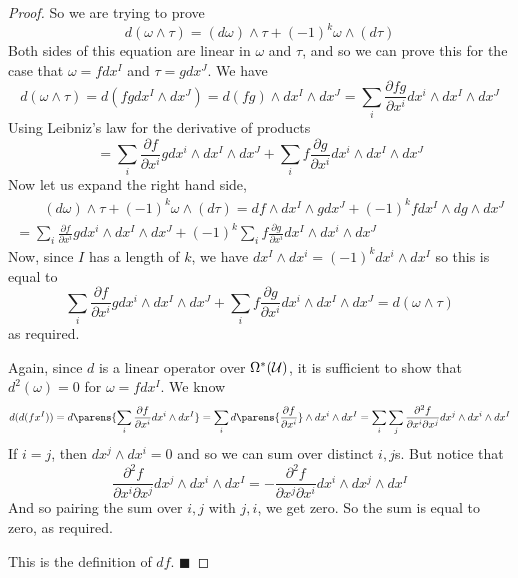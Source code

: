 \documentclass[10pt]{article}
\def\mU{{\cal U}}
\def\qed{%
    \ifmmode%
        \eqno\blacksquare%
    \else%
        \hskip1cm\allowbreak\hbox{}\nobreak\hfill$\blacksquare$%
    \fi%
}
\begin{document}
\begin{proof}

    \benum
        \item So we are trying to prove
            \[ d(\omega\wedge\tau) = (d\omega)\wedge\tau + (-1)^k\omega\wedge(d\tau) \]
            Both sides of this equation are linear in $\omega$ and $\tau$, and so we can prove this for the case that $\omega=fdx^I$ and $\tau=gdx^J$.
            We have
            \[ d(\omega\wedge\tau) = d(fgdx^I\wedge dx^J) = d(fg)\wedge dx^I\wedge dx^J = \sum_i\frac{\partial fg}{\partial x^i}dx^i\wedge dx^I\wedge dx^J \]
            Using Leibniz's law for the derivative of products
            \[ = \sum_i\frac{\partial f}{\partial x^i}gdx^i\wedge dx^I\wedge dx^J + \sum_if\frac{\partial g}{\partial x^i}dx^i\wedge dx^I\wedge dx^J \]
            Now let us expand the right hand side,
            \begin{multline*}
                \qquad(d\omega)\wedge\tau + (-1)^k\omega\wedge(d\tau) = df\wedge dx^I\wedge gdx^J + (-1)^k fdx^I\wedge dg\wedge dx^J \\
                = \sum_i\frac{\partial f}{\partial x^i}gdx^i\wedge dx^I\wedge dx^J + (-1)^k\sum_i f\frac{\partial g}{\partial x^i}dx^I\wedge dx^i\wedge dx^J
            \end{multline*}
            Now, since $I$ has a length of $k$, we have $dx^I\wedge dx^i=(-1)^kdx^i\wedge dx^I$ so this is equal to
            \[ \sum_i\frac{\partial f}{\partial x^i}gdx^i\wedge dx^I\wedge dx^J + \sum_i f\frac{\partial g}{\partial x^i}dx^i\wedge dx^I\wedge dx^J = d(\omega\wedge\tau) \]
            as required.
        \item Again, since $d$ is a linear operator over $\Omega^*(\mU)$, it is sufficient to show that $d^2(\omega)=0$ for $\omega=fdx^I$.
            We know
            \[ d(d(fx^I)) = d\parens{\sum_i\frac{\partial f}{\partial x^i}dx^i\wedge dx^I} = \sum_id\parens{\frac{\partial f}{\partial x^i}}\wedge dx^i\wedge dx^I =
            \sum_i\sum_j\frac{\partial^2 f}{\partial x^i\partial x^j}dx^j\wedge dx^i\wedge dx^I \]
            If $i=j$, then $dx^j\wedge dx^i=0$ and so we can sum over distinct $i,j$s.
            But notice that
            \[ \frac{\partial^2 f}{\partial x^i\partial x^j}dx^j\wedge dx^i\wedge dx^I = -\frac{\partial^2 f}{\partial x^j\partial x^i}dx^i\wedge dx^j\wedge dx^I \]
            And so pairing the sum over $i,j$ with $j,i$, we get zero.
            So the sum is equal to zero, as required.
        \item This is the definition of $df$.
            \qed
    \eenum

\end{proof}
\end{document}
